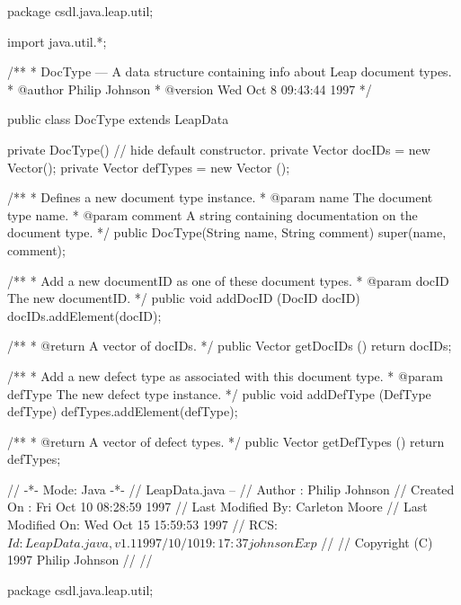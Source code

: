 package csdl.java.leap.util;

import java.util.*;


/**
 * DocType --- A data structure containing info about Leap document types.
 * @author         Philip Johnson
 * @version        Wed Oct  8 09:43:44 1997
 */

public class DocType extends LeapData {

  private DocType() {} // hide default constructor.
  private Vector docIDs = new Vector(); 
  private Vector defTypes = new Vector ();

  /**
   * Defines a new document type instance.
   * @param name The document type name.
   * @param comment A string containing documentation on the document type.
   */
  public DocType(String name, String comment) {
    super(name, comment);
  }


  /**
   * Add a new documentID as one of these document types.
   * @param docID The new documentID.
   */  
  public void addDocID (DocID docID) {
    docIDs.addElement(docID);
  }

  /**
   * @return A vector of docIDs.
   */
  public Vector getDocIDs () {
    return docIDs;
  }


  /**
   * Add a new defect type as associated with this document type.
   * @param defType The new defect type instance.
   */  
  public void addDefType (DefType defType) {
    defTypes.addElement(defType);
  }

  /**
   * @return A vector of defect types.
   */
  public Vector getDefTypes () {
    return defTypes;
  }

}



                                                                                                                                                                                                                                                                                                                                                                                                                                           //                              -*- Mode: Java -*- 
// LeapData.java -- 
// Author          : Philip Johnson
// Created On      : Fri Oct 10 08:28:59 1997
// Last Modified By: Carleton Moore
// Last Modified On: Wed Oct 15 15:59:53 1997
// RCS: $Id: LeapData.java,v 1.1 1997/10/10 19:17:37 johnson Exp $
// 
//   Copyright (C) 1997 Philip Johnson
// 
// 

package csdl.java.leap.util;

